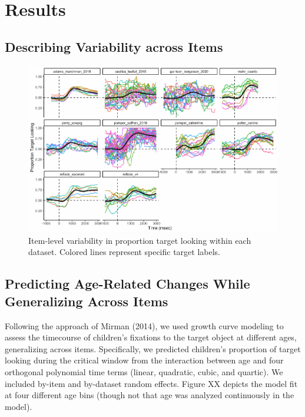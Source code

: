 \documentclass[10pt, letterpaper]{article}
\newenvironment{CodeChunk}{}{}
\begin{document}
\hypertarget{results}{%
\section{Results}\label{results}}

\hypertarget{describing-variability-across-items}{%
\subsection{Describing Variability across
Items}\label{describing-variability-across-items}}

\begin{CodeChunk}
\begin{figure}[h]

{\centering \includegraphics{figs/peekbank_item_vis-1} 

}

\caption[Item-level variability in proportion target looking within each dataset]{Item-level variability in proportion target looking within each dataset. Colored lines represent specific target labels.}\label{fig:peekbank_item_vis}
\end{figure}
\end{CodeChunk}

\hypertarget{predicting-age-related-changes-while-generalizing-across-items}{%
\subsection{Predicting Age-Related Changes While Generalizing Across
Items}\label{predicting-age-related-changes-while-generalizing-across-items}}

Following the approach of Mirman (2014), we used growth curve modeling
to assess the timecourse of children's fixations to the target object at
different ages, generalizing across items. Specifically, we predicted
children's proportion of target looking during the critical window from
the interaction between age and four orthogonal polynomial time terms
(linear, quadratic, cubic, and quartic). We included by-item and
by-dataset random effects. Figure XX depicts the model fit at four
different age bins (though not that age was analyzed continuously in the
model).
\end{document}

